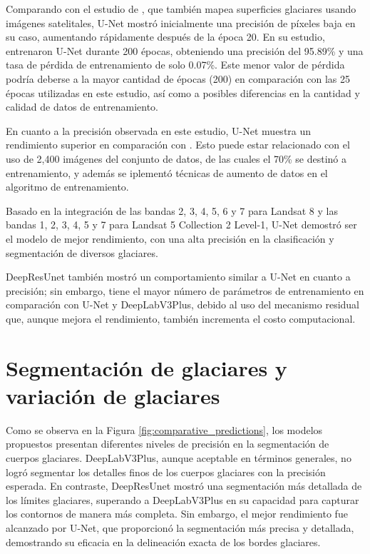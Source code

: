 Comparando con el estudio de \parencite{rajat2022glacier}, que también mapea superficies glaciares usando imágenes satelitales, U-Net mostró inicialmente una precisión de píxeles baja en su caso, aumentando rápidamente después de la época 20. En su estudio, entrenaron U-Net durante 200 épocas, obteniendo una precisión del 95.89\% y una tasa de pérdida de entrenamiento de solo 0.07\%. Este menor valor de pérdida podría deberse a la mayor cantidad de épocas (200) en comparación con las 25 épocas utilizadas en este estudio, así como a posibles diferencias en la cantidad y calidad de datos de entrenamiento.

En cuanto a la precisión observada en este estudio, U-Net muestra un rendimiento superior en comparación con \parencite{rajat2022glacier}. Esto puede estar relacionado con el uso de 2,400 imágenes del conjunto de datos, de las cuales el 70\% se destinó a entrenamiento, y  además se iplementó técnicas de aumento de datos en el algoritmo de entrenamiento.

Basado en la integración de las bandas 2, 3, 4, 5, 6 y 7 para Landsat 8 y las bandas 1, 2, 3, 4, 5 y 7 para Landsat 5 Collection 2 Level-1, U-Net demostró ser el modelo de mejor rendimiento, con una alta precisión en la clasificación y segmentación de diversos glaciares.

DeepResUnet también mostró un comportamiento similar a U-Net en cuanto a precisión; sin embargo, tiene el mayor número de parámetros de entrenamiento en comparación con U-Net y DeepLabV3Plus, debido al uso del mecanismo residual que, aunque mejora el rendimiento, también incrementa el costo computacional.

\section{Segmentación de glaciares y variación de glaciares}

Como se observa en la Figura \ref{fig:comparative_predictions}, los modelos propuestos presentan diferentes niveles de precisión en la segmentación de cuerpos glaciares. DeepLabV3Plus, aunque aceptable en términos generales, no logró segmentar los detalles finos de los cuerpos glaciares con la precisión esperada. En contraste, DeepResUnet mostró una segmentación más detallada de los límites glaciares, superando a DeepLabV3Plus en su capacidad para capturar los contornos de manera más completa. Sin embargo, el mejor rendimiento fue alcanzado por U-Net, que proporcionó la segmentación más precisa y detallada, demostrando su eficacia en la delineación exacta de los bordes glaciares.

